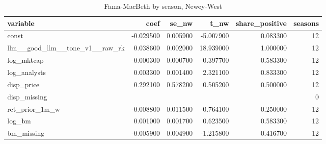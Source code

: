 \begin{table}
\caption{Fama-MacBeth by season, Newey-West}
\label{tab:t8_fama_macbeth__llm__good_llm__tone_v1__raw__car_0_1_ff4__validation}
\begin{tabular}{lrrrrr}
\toprule
variable & coef & se\_nw & t\_nw & share\_positive & seasons \\
\midrule
const & -0.029500 & 0.005900 & -5.007900 & 0.083300 & 12 \\
llm\_\_good\_llm\_\_tone\_v1\_\_raw\_rk & 0.038600 & 0.002000 & 18.939000 & 1.000000 & 12 \\
log\_mktcap & -0.000300 & 0.000700 & -0.397700 & 0.583300 & 12 \\
log\_analysts & 0.003300 & 0.001400 & 2.321100 & 0.833300 & 12 \\
disp\_price & 0.292100 & 0.578200 & 0.505200 & 0.500000 & 12 \\
disp\_missing &  &  &  &  & 0 \\
ret\_prior\_1m\_w & -0.008800 & 0.011500 & -0.764100 & 0.250000 & 12 \\
log\_bm & 0.001000 & 0.001700 & 0.623500 & 0.583300 & 12 \\
bm\_missing & -0.005900 & 0.004900 & -1.215800 & 0.416700 & 12 \\
\bottomrule
\end{tabular}
\end{table}
